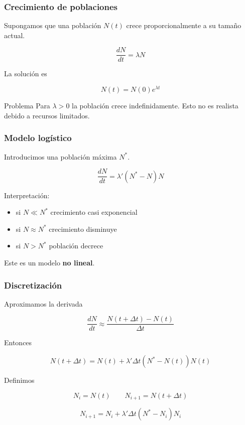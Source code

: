 
\begin{frame}
\frametitle{Crecimiento de poblaciones}

Supongamos que una población $N(t)$ crece proporcionalmente
a su tamaño actual.

\[
\frac{dN}{dt}=\lambda N
\]

La solución es

\[
N(t)=N(0)e^{\lambda t}
\]

\begin{block}{Problema}
Para $\lambda>0$ la población crece indefinidamente.
Esto no es realista debido a recursos limitados.
\end{block}

\end{frame}


\begin{frame}
\frametitle{Modelo logístico}

Introducimos una población máxima $N^*$.

\[
\frac{dN}{dt}=\lambda'(N^*-N)N
\]

Interpretación:

\begin{itemize}
\item si $N\ll N^*$ crecimiento casi exponencial
\item si $N\approx N^*$ crecimiento disminuye
\item si $N>N^*$ población decrece
\end{itemize}

Este es un modelo \textbf{no lineal}.

\end{frame}


\begin{frame}
\frametitle{Discretización}

Aproximamos la derivada

\[
\frac{dN}{dt}\approx
\frac{N(t+\Delta t)-N(t)}{\Delta t}
\]

Entonces

\[
N(t+\Delta t)=N(t)+\lambda'\Delta t(N^*-N(t))N(t)
\]

Definimos

\[
N_i=N(t)
\qquad
N_{i+1}=N(t+\Delta t)
\]

\[
N_{i+1}=N_i+\lambda'\Delta t(N^*-N_i)N_i
\]

\end{frame}

